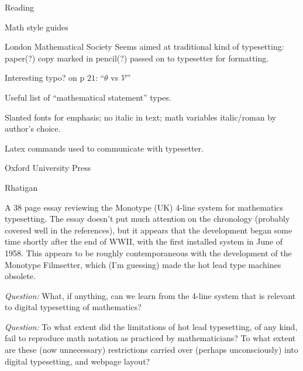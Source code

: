 \documentclass[11pt]{PalisadesLakesBook}
\begin{document}
\begin{plSection}{Reading}
\begin{plSection}{Math style guides}
\begin{plSection}{London Mathematical Society}
Seems aimed at traditional kind of typesetting:
paper(?) copy marked in pencil(?)  
passed on to typesetter for formatting.

Interesting typo? on p $21$: ``$\theta$ vs $\mathscr{V}$''

Useful list of ``mathematical statement'' types.

Slanted fonts for emphasis; no italic in text;
math variables italic/roman by author's choice.

Latex commands used to communicate with typesetter.


\end{plSection}%
\begin{plSection}{Oxford University Press}


\end{plSection}%
\end{plSection}%
\begin{plSection}{Rhatigan}
\begin{plSection}{}
\label{sec:FourLine}

A 38 page essay reviewing the Monotype (UK)
4-line system for mathematics typesetting.
The essay doesn't put much attention on the chronology
(probably covered well in the references),
but it appears that the development
began some time shortly after the end of WWII,
with the first installed system in June of 1958.
This appears to be roughly contemporaneous with
the development of the Monotype Filmsetter,
which (I'm guessing) made the hot lead type machines 
obsolete.~\cite{Eye:2012:MonotypeTimeline}

\emph{Question:} What, if anything, can we learn from the
4-line system that is relevant to digital typesetting
of mathematics?

\emph{Question:} To what extent did the limitations of
hot lead typesetting, of any kind, 
fail to reproduce math notation as practiced by mathematicians?
To what extent are these (now unnecessary) restrictions
carried over (perhaps unconsciously) into digital typesetting,
and webpage layout?


\end{plSection}
\end{plSection}
\end{plSection}
\end{document}
